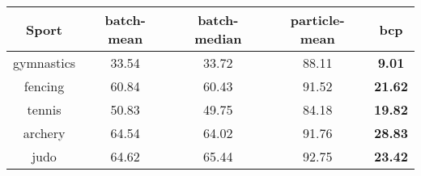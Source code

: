 \begin{tabular}{|c|c|c|c|c|}
\hline
Sport & batch-mean & batch-median & particle-mean & bcp \\
\hline
gymnastics & 33.54 & 33.72 & 88.11 & \textbf{9.01} \\
fencing & 60.84 & 60.43 & 91.52 & \textbf{21.62} \\
tennis & 50.83 & 49.75 & 84.18 & \textbf{19.82} \\
archery & 64.54 & 64.02 & 91.76 & \textbf{28.83} \\
judo & 64.62 & 65.44 & 92.75 & \textbf{23.42} \\
\hline
\end{tabular}
